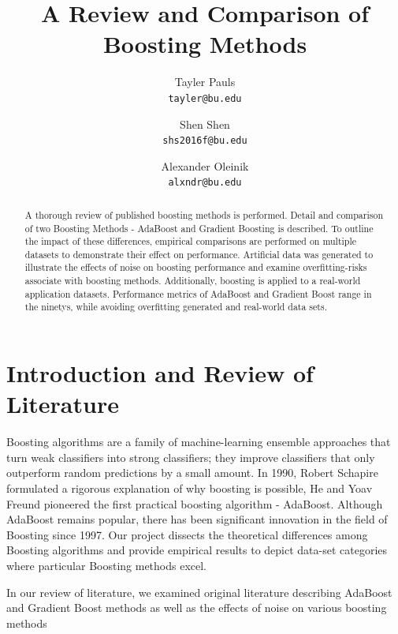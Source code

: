 \documentclass[10pt,twocolumn,letterpaper]{article}
\begin{document}
\title{A Review and Comparison of Boosting Methods}
\author{
Tayler Pauls\\
{\tt\small tayler@bu.edu}
\and
Shen Shen\\
{\tt\small shs2016f@bu.edu}
\and
Alexander Oleinik \\
{\tt\small alxndr@bu.edu}
}
\maketitle

\begin{abstract}
   A thorough review of published boosting methods is performed. Detail and comparison of two Boosting Methods - AdaBoost and Gradient Boosting is described. To outline the impact of these differences, empirical comparisons are performed on multiple datasets to demonstrate their effect on performance. Artificial data was generated to illustrate the effects of noise on boosting performance and examine overfitting-risks associate with boosting methods.  Additionally,  boosting is applied to a real-world application datasets. Performance metrics of AdaBoost and Gradient Boost range in the ninetys, while avoiding overfitting generated and real-world data sets.
 
\end{abstract}

\section{Introduction and Review of Literature}
\indent \indent Boosting algorithms are a family of machine-learning ensemble approaches that turn weak classifiers into strong classifiers; they improve classifiers that only outperform random predictions by a small amount. In 1990, Robert Schapire formulated a rigorous explanation of why boosting is possible, He and Yoav Freund pioneered the first practical boosting algorithm - AdaBoost. Although AdaBoost remains popular, there has been significant innovation in the field of Boosting since 1997. Our project dissects the theoretical differences among Boosting algorithms and provide empirical results to depict data-set categories where particular Boosting methods excel. 
 
In our review of literature, we examined original literature describing AdaBoost and Gradient Boost methods \cite{schapire2012boosting} \cite{schapire1999improved} \cite{friedman2001greedy} as well as the effects of noise on various boosting methods \cite{long2010random}
\end{document}
